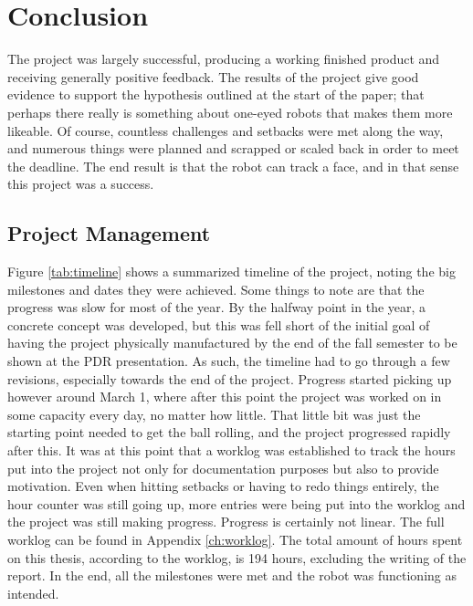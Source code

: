 \chapter{Conclusion}
The project was largely successful, producing a working finished product and receiving generally positive feedback. The results of the project give good evidence to support the hypothesis outlined at the start of the paper; that perhaps there really is something about one-eyed robots that makes them more likeable. Of course, countless challenges and setbacks were met along the way, and numerous things were planned and scrapped or scaled back in order to meet the deadline. The end result is that the robot can track a face, and in that sense this project was a success.

\section{Project Management}
Figure \ref{tab:timeline} shows a summarized timeline of the project, noting the big milestones and dates they were achieved.  Some things to note are that the progress was slow for most of the year. By the halfway point in the year, a concrete concept was developed, but this was fell short of the initial goal of having the project physically manufactured by the end of the fall semester to be shown at the PDR presentation. As such, the timeline had to go through a few revisions, especially towards the end of the project. Progress started picking up however around March 1, where after this point the project was worked on in some capacity every day, no matter how little. That little bit was just the starting point needed to get the ball rolling, and the project progressed rapidly after this. It was at this point that a worklog was established to track the hours put into the project not only for documentation purposes but also to provide motivation. Even when hitting setbacks or having to redo things entirely, the hour counter was still going up, more entries were being put into the worklog and the project was still making progress. Progress is certainly not linear. The full worklog can be found in Appendix \ref{ch:worklog}. The total amount of hours spent on this thesis, according to the worklog, is 194 hours, excluding the writing of the report. In the end, all the milestones were met and the robot was functioning as intended.

